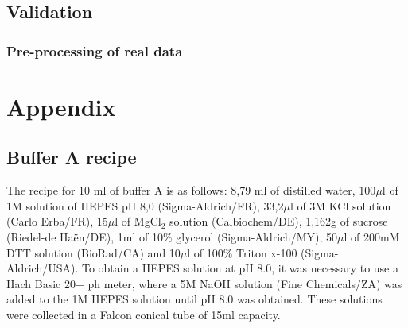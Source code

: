 \documentclass[12pt, a4paper]{article} %
\begin{document}
\setlength{\parskip}{0mm}

\setlength{\parskip}{4mm}

\subsection{Validation}

\subsubsection{Pre-processing of real data}

\setlength{\parskip}{0mm}

\setlength{\parskip}{4mm}

\newpage

\pagestyle{empty}



\newpage
\setlength{\parskip}{0mm}
\section{Appendix}

\subsection{Buffer A recipe}

The recipe for 10 ml of buffer A is as follows: 8,79 ml of distilled water, 100$\mu$l of 1M solution of HEPES pH 8,0 (Sigma-Aldrich/FR), 33,2$\mu$l of 3M KCl solution (Carlo Erba/FR), 15$\mu$l of MgCl$_{2}$ solution (Calbiochem/DE), 1,162g of sucrose (Riedel-de Haën/DE), 1ml of 10\% glycerol (Sigma-Aldrich/MY), 50$\mu$l of 200mM DTT solution (BioRad/CA) and 10$\mu$l of 100\% Triton x-100 (Sigma-Aldrich/USA). To obtain a HEPES solution at pH 8.0, it was necessary to use a Hach Basic 20+ ph meter, where a 5M NaOH solution (Fine Chemicals/ZA) was added to the 1M HEPES solution until pH 8.0 was obtained. These solutions were collected in a Falcon conical tube of 15ml capacity. 
\end{document}

